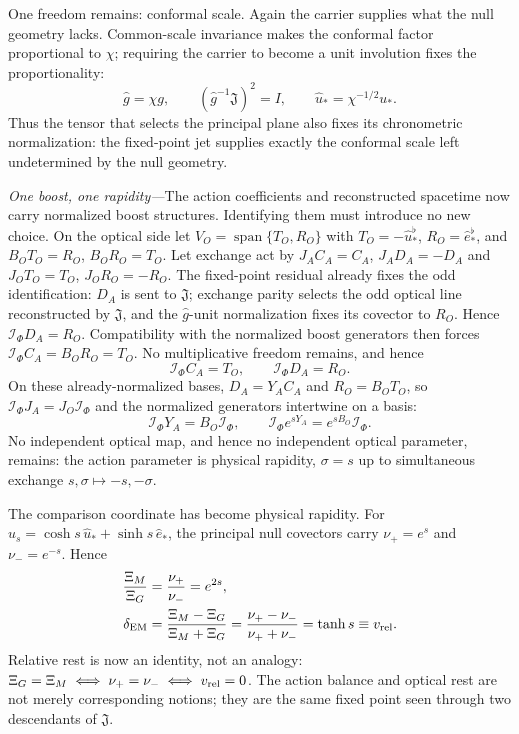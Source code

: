 \documentclass[aps,prl,reprint]{revtex4-2}
\newcommand{\EM}{\mathrm{EM}}
\newcommand{\spanop}{\operatorname{span}}
\begin{document}
One freedom remains: conformal scale. Again the carrier supplies what the null geometry lacks. Common-scale invariance makes the conformal factor proportional to $\chi$; requiring the carrier to become a unit involution fixes the proportionality:
\begin{equation}
\widehat g=\chi g,
\qquad
(\widehat g^{-1}\mathfrak J)^2=I,
\qquad
\widehat u_*=\chi^{-1/2}u_* .
\label{eq:ghat}
\end{equation}
Thus the tensor that selects the principal plane also fixes its chronometric normalization: the fixed-point jet supplies exactly the conformal scale left undetermined by the null geometry.

\textit{One boost, one rapidity---}The action coefficients and reconstructed spacetime now carry normalized boost structures. Identifying them must introduce no new choice. On the optical side let
$V_O=\spanop\{T_O,R_O\}$ with
$T_O=-\widehat u_*^\flat$, $R_O=\widehat e_*^\flat$, and
$B_OT_O=R_O$, $B_OR_O=T_O$. Let exchange act by $J_AC_A=C_A$, $J_AD_A=-D_A$ and $J_OT_O=T_O$, $J_OR_O=-R_O$. The fixed-point residual already fixes the odd identification: $D_A$ is sent to $\mathfrak J$; exchange parity selects the odd optical line reconstructed by $\mathfrak J$, and the $\widehat g$-unit normalization fixes its covector to $R_O$. Hence $\mathcal I_\Phi D_A=R_O$. Compatibility with the normalized boost generators then forces $\mathcal I_\Phi C_A=B_OR_O=T_O$. No multiplicative freedom remains, and hence
\begin{equation}
\mathcal I_\Phi C_A=T_O,
\qquad
\mathcal I_\Phi D_A=R_O .
\label{eq:map}
\end{equation}
On these already-normalized bases, $D_A=Y_AC_A$ and $R_O=B_OT_O$, so $\mathcal I_\Phi J_A=J_O\mathcal I_\Phi$ and the normalized generators intertwine on a basis:
\begin{equation}
\mathcal I_\Phi Y_A=B_O\mathcal I_\Phi,
\qquad
\mathcal I_\Phi e^{sY_A}=e^{sB_O}\mathcal I_\Phi .
\label{eq:intertwiner}
\end{equation}
No independent optical map, and hence no independent optical parameter, remains: the action parameter is physical rapidity, $\sigma=s$ up to simultaneous exchange $s,\sigma\mapsto-s,-\sigma$.

The comparison coordinate has become physical rapidity. For
$\widehat u_s=\cosh s\,\widehat u_*+\sinh s\,\widehat e_*$, the principal null covectors carry $\nu_+=e^s$ and $\nu_-=e^{-s}$. Hence
\begin{equation}
\begin{aligned}
\frac{\Xi_M}{\Xi_G}&=\frac{\nu_+}{\nu_-}=e^{2s},\\
\delta_{\EM}
&=\frac{\Xi_M-\Xi_G}{\Xi_M+\Xi_G}
=\frac{\nu_+-\nu_-}{\nu_++\nu_-}
=\tanh s\equiv v_{\rm rel}.
\end{aligned}
\label{eq:masterratio}
\end{equation}
Relative rest is now an identity, not an analogy:
$\Xi_G=\Xi_M\iff\nu_+=\nu_-\iff v_{\rm rel}=0$.
The action balance and optical rest are not merely corresponding notions; they are the same fixed point seen through two descendants of $\mathfrak J$.
\end{document}
